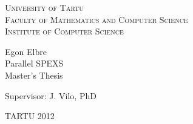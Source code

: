 \begin{titlepage}
\begin{center}

{\scshape
    University of Tartu                  \\[2mm]
    Faculty of Mathematics and Computer Science   \\[3mm]
    Institute of Computer Science
}

  {\Large Egon Elbre } \\[5mm]
  {\Huge  Parallel SPEXS } \\[5mm]
  {\large Master's Thesis }

\begin{flushright}
    {\Large Supervisor: J. Vilo, PhD }
\end{flushright}


{\large TARTU 2012 }

\end{center}
\end{titlepage}
